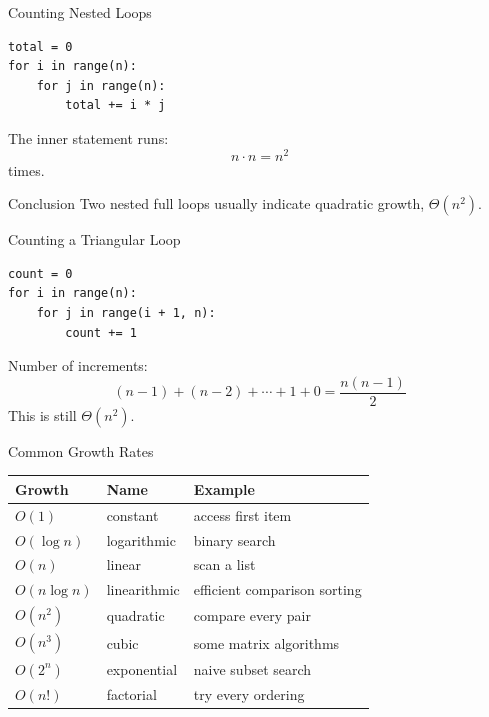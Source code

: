 \documentclass[aspectratio=169,xcolor=dvipsnames]{beamer}
\begin{document}
\begin{frame}[fragile]{Counting Nested Loops}
  \begin{lstlisting}
total = 0
for i in range(n):
    for j in range(n):
        total += i * j
  \end{lstlisting}
  \vspace{0.5em}
  The inner statement runs:
  \[
    n \cdot n = n^2
  \]
  times.
  \vspace{0.5em}
  \begin{alertblock}{Conclusion}
    Two nested full loops usually indicate quadratic growth, $\Theta(n^2)$.
  \end{alertblock}
\end{frame}

\begin{frame}[fragile]{Counting a Triangular Loop}
  \begin{lstlisting}
count = 0
for i in range(n):
    for j in range(i + 1, n):
        count += 1
  \end{lstlisting}
  Number of increments:
  \[
    (n-1) + (n-2) + \cdots + 1 + 0 = \frac{n(n-1)}{2}
  \]
  \vspace{0.5em}
  This is still $\Theta(n^2)$.
\end{frame}

\begin{frame}{Common Growth Rates}
  \begin{table}
    \centering
    \begin{tabular}{lll}
      \toprule
      Growth & Name & Example \\
      \midrule
      $O(1)$ & constant & access first item \\
      $O(\log n)$ & logarithmic & binary search \\
      $O(n)$ & linear & scan a list \\
      $O(n\log n)$ & linearithmic & efficient comparison sorting \\
      $O(n^2)$ & quadratic & compare every pair \\
      $O(n^3)$ & cubic & some matrix algorithms \\
      $O(2^n)$ & exponential & naive subset search \\
      $O(n!)$ & factorial & try every ordering \\
      \bottomrule
    \end{tabular}
  \end{table}
\end{frame}
\end{document}
